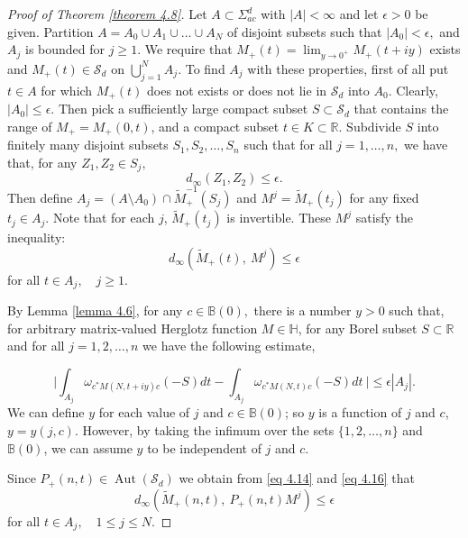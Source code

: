 \documentclass[10pt,a4paper]{amsart}
\newcommand{\R}{\mathbb{R}}
\begin{document}
\begin{proof}[Proof of Theorem \ref{theorem 4.8}] Let $ A \subset \Sigma_{ac}^d$ with $|A| < \infty$ and let $\epsilon >0$ be given. Partition   $A = A_0\cup A_1 \cup \dots \cup A_N$ of disjoint 
 subsets such that $|A_0| <\epsilon,  $ and $ A_j$ is bounded for $j\geq 1.$ We require that $M_+(t) = \lim_{y \rightarrow 0^+} M_+(t+iy)$ exists and $M_+(t) \in \mathcal S_d$ on $ \bigcup_{j=1}^{N} A_j .$ To find $A_j$ with these properties, first of all put $t \in A$ for which $M_+(t)$ does not exists or does not lie in $\mathcal S_d $ into $A_0.$ Clearly, $|A_0|\leq \epsilon.$ Then pick a sufficiently large compact subset $S \subset \mathcal S_d$ that contains the range of $M_+= M_+(0,t)$, and a compact subset $ t\in K \subset \R .$ Subdivide $S$ into finitely many disjoint subsets   $ S_1, S_2,  \dots ,S_n$  such that for all $j=1, \dots, n, $ we have that, for any $ Z_1, Z_2 \in S_j,$   $$ d_{\infty}(Z_1, Z_2) \leq \epsilon .$$ Then define $A_j = (A \setminus A_0)\cap \tilde M_+^{-1}(S_j)$ and $ M^j = \tilde M_+(t_j) $ for any fixed $ t_j \in A_j. $ Note that for each $j$, $\tilde M_+(t_j)$ is invertible. These $ M^j $ satisfy the  inequality:  \begin{equation} \label{eq 4.16} d_{\infty}(\tilde M_+(t), \ M^j) \leq \epsilon \end{equation} for all $t \in A_j,\quad j\geq 1 .$
 
 By Lemma \ref{lemma 4.6}, for any $c\in \mathbb B(0),$ there is a number $y>0$ such that, for arbitrary matrix-valued Herglotz function $M \in \mathbb H$, for any Borel subset $S\subset \R$ and for all $j =1,2, \dots, n$ we have the following estimate,
 
 \begin{equation} \label{eq 4.22}  \Big | \int_{A_j} \omega_{c^*  M (N,t+iy)c} (-S) dt - \int_{A_j} \omega_{c^*  M (N,t)c}(-S) dt\  \Big | \leq \epsilon |A_j| .\end{equation}
We can define $y$ for each value of $j$ and $c\in \mathbb B(0)$; so $y$ is a function of $j $ and $c$, $ y =y(j,c)$. However, by taking the infimum over the sets $ \{1,2, \dots, n\}$ and $\mathbb B(0)$, we can assume $y$ to be independent of $j$ and $c$.

Since $P_+(n,t) \in  \operatorname{Aut}(\mathcal S_d)$ we obtain from \eqref{eq 4.14} and \eqref{eq 4.16}
that
 \begin{equation} \label{eq 4.18} d_{\infty}(\tilde M_+(n,t), \ P_+(n,t) M^j) \leq \epsilon \end{equation}
 for all $t \in A_j,\quad  1\leq j \leq N .$


\end{proof}
\end{document}
